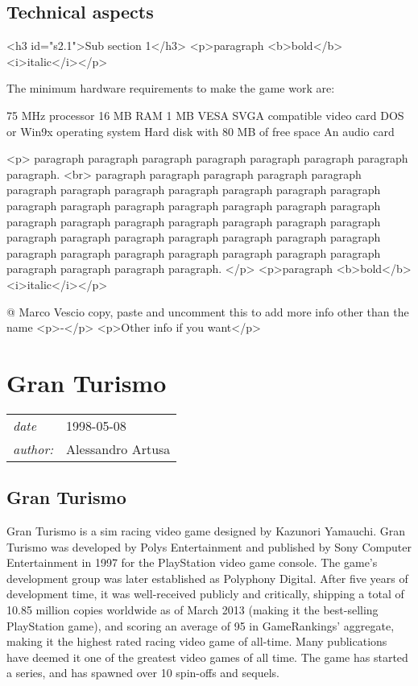 \documentclass[a4paper,10pt]{book}
\newcommand{\pageHeader}[4]{
    \section{#1}
    \vspace{-0.3cm}
    \begin{table}[h!]
     \begin{tabular}{ll}
        \hline
        \textit{date} & #2 \\
        \textit{author: } & #3\\
        \hline
     \end{tabular}
    \end{table}
    \vspace{-0.3cm}
}
\begin{document}
 \subsection{Technical aspects }
 <h3 id="s2.1">Sub section 1</h3>
        <p>paragraph <b>bold</b> <i>italic</i></p> 
 
          The minimum hardware requirements to make the game work are:
           
 75 MHz processor 
 16 MB RAM 
 1 MB VESA SVGA compatible video card 
  DOS or Win9x operating system 
 Hard disk with 80 MB of free space 
 An audio card 
 
 
 <p>
          paragraph paragraph paragraph paragraph paragraph paragraph paragraph paragraph. <br>
          paragraph paragraph paragraph paragraph paragraph paragraph paragraph paragraph paragraph paragraph paragraph paragraph paragraph paragraph paragraph paragraph paragraph paragraph paragraph paragraph paragraph paragraph paragraph paragraph paragraph paragraph paragraph paragraph paragraph paragraph paragraph paragraph paragraph paragraph paragraph paragraph paragraph paragraph paragraph paragraph paragraph paragraph paragraph paragraph.
        </p>
        <p>paragraph <b>bold</b> <i>italic</i></p> 
 
 @ Marco Vescio 
  copy, paste and uncomment this to add more info other than the name
            <p>-</p>
            <p>Other info if you want</p>
           
 
 \newpage\pageHeader{Gran Turismo}{1998-05-08}{Alessandro Artusa}{Page of the first Gran Turismo made in 1997 by Polys Entertainment}
 \subsection{Gran Turismo }
 
          Gran Turismo is a sim racing video game designed by Kazunori Yamauchi. Gran Turismo was developed by Polys Entertainment and published by Sony Computer Entertainment in 1997 for the PlayStation video game console. The game's development group was later established as Polyphony Digital.  
          After five years of development time, it was well-received publicly and critically, shipping a total of 10.85 million copies worldwide as of March 2013 (making it the best-selling PlayStation game), and scoring an average of 95 in GameRankings' aggregate, making it the highest rated racing video game of all-time.  
          Many publications have deemed it one of the greatest video games of all time. The game has started a series, and has spawned over 10 spin-offs and sequels.
       
\end{document}

